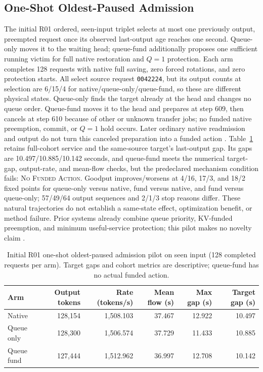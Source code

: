 \documentclass[10pt]{article}
\begin{document}
\subsection{One-Shot Oldest-Paused Admission}
The initial R01 ordered, seen-input triplet selects at most one previously output, preempted request once its observed last-output age reaches one second. Queue-only moves it to the waiting head; queue-fund additionally proposes one sufficient running victim for full native restoration and $Q=1$ protection. Each arm completes 128 requests with native full saving, zero forced rotations, and zero protection starts. All select source request \texttt{0042224}, but its output counts at selection are 6/15/4 for native/queue-only/queue-fund, so these are different physical states. Queue-only finds the target already at the head and changes no queue order. Queue-fund moves it to the head and prepares at step 609, then cancels at step 610 because of other or unknown transfer jobs; no funded native preemption, commit, or $Q=1$ hold occurs. Later ordinary native readmission and output do not turn this canceled preparation into a funded action \cite{oldestadmission}. Table~\ref{tab:oldestadmission} retains full-cohort service and the same-source target's last-output gap. Its gaps are 10.497/10.885/10.142 seconds, and queue-fund meets the numerical target-gap, output-rate, and mean-flow checks, but the predeclared mechanism condition fails: \textsc{No Funded Action}. Goodput improves/worsens at 4/16, 17/3, and 18/2 fixed points for queue-only versus native, fund versus native, and fund versus queue-only; 57/49/64 output sequences and 2/1/3 stop reasons differ. These natural trajectories do not establish a same-state effect, optimization benefit, or method failure. Prior systems already combine queue priority, KV-funded preemption, and minimum useful-service protection; this pilot makes no novelty claim \cite{cacheopt,uniboost}.

\begin{table}[h]
\centering\small
\caption{Initial R01 one-shot oldest-paused admission pilot on seen input (128 completed requests per arm). Target gaps and cohort metrics are descriptive; queue-fund has no actual funded action.}
\label{tab:oldestadmission}
\begin{tabular}{lrrrrr}
\toprule
Arm & Output tokens & Rate (tokens/s) & Mean flow (s) & Max gap (s) & Target gap (s) \\
\midrule
Native & 128,154 & 1,508.103 & 37.467 & 12.922 & 10.497 \\
Queue only & 128,300 & 1,506.574 & 37.729 & 11.433 & 10.885 \\
Queue fund & 127,444 & 1,512.962 & 36.997 & 12.708 & 10.142 \\
\bottomrule
\end{tabular}
\end{table}
\end{document}
